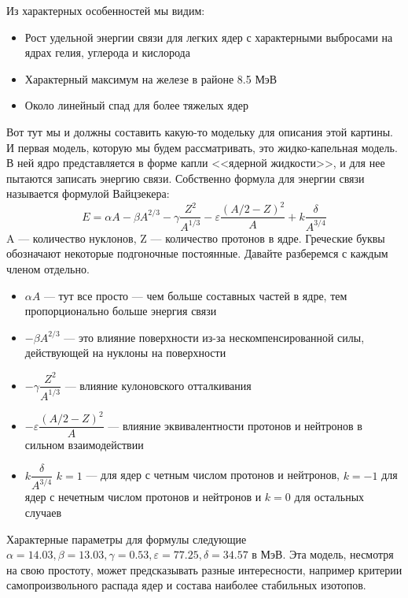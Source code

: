 \documentclass[12pt]{article}
\begin{document}
\noindent
Из характерных особенностей мы видим:
\begin{itemize}
    \item Рост удельной энергии связи для легких ядер с характерными выбросами на ядрах гелия, углерода и кислорода
    \item Характерный максимум на железе в районе 8.5 МэВ
    \item Около линейный спад для более тяжелых ядер
\end{itemize}
Вот тут мы и должны составить какую-то модельку для описания этой картины. И первая модель, которую мы будем рассматривать, это жидко-капельная модель. В ней ядро представляется в форме капли <<ядерной жидкости>>, и для нее пытаются записать энергию связи. Собственно формула для энергии связи называется формулой Вайцзекера:
\begin{equation}
    E=\alpha A - \beta A^{2/3} - \gamma \dfrac{Z^2}{A^{1/3}} - \varepsilon \dfrac{(A/2-Z)^2}{A} + k\dfrac{\delta}{A^{3/4}}
\end{equation}
A --- количество нуклонов, Z --- количество протонов в ядре. Греческие буквы обозначают некоторые подгоночные постоянные. Давайте разберемся с каждым членом отдельно.

\newpage
\begin{itemize}
    \item $\alpha A$ --- тут все просто --- чем больше составных частей в ядре, тем пропорционально больше энергия связи
    \item $-\beta A^{2/3}$ --- это влияние поверхности из-за нескомпенсированной силы, действующей на нуклоны на поверхности
    \item $-\gamma \dfrac{Z^2}{A^{1/3}}$ --- влияние кулоновского отталкивания
    \item $-\varepsilon \dfrac{(A/2-Z)^2}{A}$ --- влияние эквивалентности протонов и нейтронов в сильном взаимодействии
    \item $k\dfrac{\delta}{A^{3/4}}$ $k=1$ --- для ядер с четным числом \vspace{1mm} протонов и нейтронов, $k=-1$ для ядер с нечетным числом протонов и нейтронов и $k=0$ для остальных случаев
\end{itemize}
Характерные параметры для формулы следующие $\alpha = 14.03, \beta = 13.03, \gamma = 0.53, \varepsilon = 77.25, \delta = 34.57$ в МэВ. Эта модель, несмотря на свою простоту, может предсказывать разные интересности, например критерии самопроизвольного распада ядер и состава наиболее стабильных изотопов.
\end{document}
